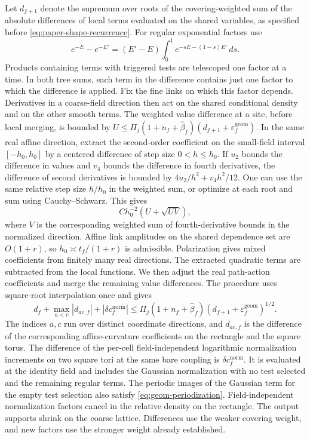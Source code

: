 \documentclass[11pt,a4paper]{article}
\numberwithin{equation}{section}
\begin{document}
Let \(d_{f+1}\) denote the supremum over roots of the covering-weighted sum of the absolute differences of local terms evaluated on the shared variables, as specified before \eqref{eq:paper-shape-recurrence}. For regular exponential factors use
\[
 e^{-E}-e^{-E'}=(E'-E)\int_0^1 e^{-sE-(1-s)E'}\,ds.
\]
Products containing terms with triggered tests are telescoped one factor at a time. In both tree sums, each term in the difference contains just one factor to which the difference is applied. Fix the fine links on which this factor depends. Derivatives in a coarse-field direction then act on the shared conditional density and on the other smooth terms. The weighted value difference at a site, before local merging, is bounded by \(U\le \Pi_j(1+n_f+\widehat\beta_f)(d_{f+1}+\varepsilon_f^{\mathrm{geom}})\). In the same real affine direction, extract the second-order coefficient on the small-field interval \([-h_0,h_0]\) by a centered difference of step size \(0<h\le h_0\). If \(u_2\) bounds the difference in values and \(v_4\) bounds the difference in fourth derivatives, the difference of second derivatives is bounded by \(4u_2/h^2+v_4h^2/12\). One can use the same relative step size \(h/h_0\) in the weighted sum, or optimize at each root and sum using Cauchy--Schwarz. This gives
\begin{equation}
 C h_0^{-2}(U+\sqrt{UV}),
 \label{eq:geom-hessian}
\end{equation}
where \(V\) is the corresponding weighted sum of fourth-derivative bounds in the normalized direction. Affine link amplitudes on the shared dependence set are \(O(1+r)\), so \(h_0\asymp t_f/(1+r)\) is admissible. Polarization gives mixed coefficients from finitely many real directions. The extracted quadratic terms are subtracted from the local functions. We then adjust the real path-action coefficients and merge the remaining value differences. The procedure uses square-root interpolation once and gives
\begin{equation}
 d_f+\max_{a<c}|d_{ac,f}|+|\delta c_f^{\mathrm{norm}}|
 \le \Pi_j(1+n_f+\widehat\beta_f)(d_{f+1}+\varepsilon_f^{\mathrm{geom}})^{1/2}.
 \label{eq:geom-one-step}
\end{equation}
The indices \(a,c\) run over distinct coordinate directions, and \(d_{ac,f}\) is the difference of the corresponding affine-curvature coefficients on the rectangle and the square torus. The difference of the per-cell field-independent logarithmic normalization increments on two square tori at the same bare coupling is \(\delta c_f^{\mathrm{norm}}\). It is evaluated at the identity field and includes the Gaussian normalization with no test selected and the remaining regular terms. The periodic images of the Gaussian term for the empty test selection also satisfy \eqref{eq:geom-periodization}. Field-independent normalization factors cancel in the relative density on the rectangle. The output supports shrink on the coarse lattice. Differences use the weaker covering weight, and new factors use the stronger weight already established.
\end{document}
